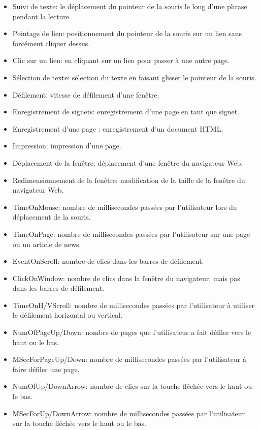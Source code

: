\begin{itemize}
    \item Suivi de texte: le déplacement du pointeur de la souris le long d'une phrase pendant la lecture.
    \item Pointage de lien: positionnement du pointeur de la souris sur un lien sans forcément cliquer dessus.
    \item Clic sur un lien: en cliquant sur un lien pour passer à une autre page.
    \item Sélection de texte: sélection du texte en faisant glisser le pointeur de la souris.
    \item Défilement: vitesse de défilement d'une fenêtre.
    \item Enregistrement de signets: enregistrement d'une page en tant que signet.
    \item Enregistrement d'une page : enregistrement d'un document HTML.
    \item Impression: impression d'une page.
    \item Déplacement de la fenêtre: déplacement d'une fenêtre du navigateur Web.
    \item Redimensionnement de la fenêtre: modification de la taille de la fenêtre du navigateur Web.
    \item TimeOnMouse: nombre de millisecondes passées par l'utilisateur lors du déplacement de la souris.
    \item TimeOnPage: nombre de millisecondes passées par l'utilisateur sur une page ou un article de news.
    \item EventOnScroll: nombre de clics dans les barres de défilement.
    \item ClickOnWindow: nombre de clics dans la fenêtre du navigateur, mais pas dans les barres de défilement.
    \item TimeOnH/VScroll: nombre de millisecondes passées par l'utilisateur à utiliser le défilement horizontal ou vertical.
    \item NumOfPageUp/Down: nombre de pages que l'utilisateur a fait défiler vers le haut ou le bas.
    \item MSecForPageUp/Down: nombre de millisecondes passées par l'utilisateur à faire défiler une page.
    \item NumOfUp/DownArrow: nombre de clics sur la touche fléchée vers le haut ou le bas.
    \item MSecForUp/DownArrow: nombre de millisecondes passées par l'utilisateur sur la touche fléchée vers le haut ou le bas.
\end{itemize}

